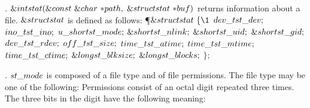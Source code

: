 . \CD{}$\&{int}\ \\{stat}(\&{const}\ \&{char}\ {*}\\{path},\;\&{struct}\ %
\\{stat}\ {*}\\{buf})$\DC{} returns information about a file.
\CD{}$\&{struct}\ \\{stat}$\DC{} is defined as follows:
\Y\P $\&{struct}\ \\{stat}\ \{\1$\6
$\\{dev\_t}\ \\{st\_dev};$\5
\6
$\\{ino\_t}\ \\{st\_ino};$\5
\6
$\\{u\_short}\ \\{st\_mode};$\5
\6
$\&{short}\ \\{st\_nlink};$\5
\6
$\&{short}\ \\{st\_uid};$\5
\6
$\&{short}\ \\{st\_gid};$\5
\6
$\\{dev\_t}\ \\{st\_rdev};$\5
\6
$\\{off\_t}\ \\{st\_size};$\6
$\\{time\_t}\ \\{st\_atime};$\5
\6
$\\{time\_t}\ \\{st\_mtime};$\6
$\\{time\_t}\ \\{st\_ctime};$\6
$\&{long}\ \\{st\_blksize};$\6
$\&{long}\ \\{st\_blocks};$\2\6
$\};$\par
\fi

. \CD{}$\\{st\_mode}$\DC{} is composed of a file type and of file
permissions. The file type
may be one of the following:
\medskip{}
\medskip Permissions consist of an octal digit repeated three times. The three
bits
in the digit have the following meaning:
\medskip{}

